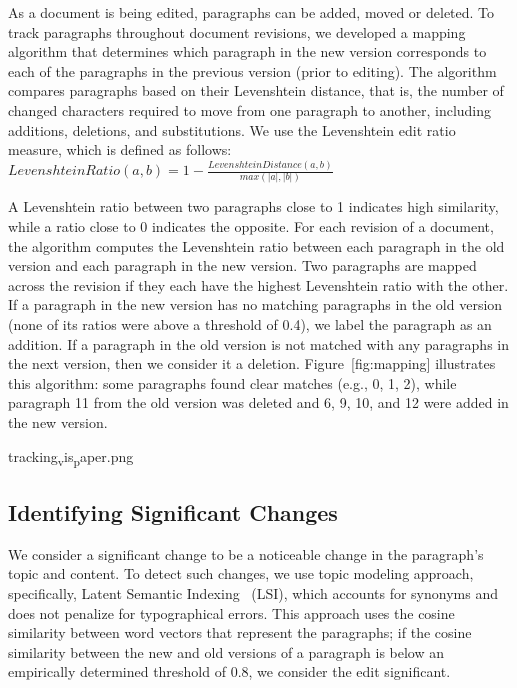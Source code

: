 As a document is being edited, paragraphs can be added, moved or
deleted. To track paragraphs throughout document revisions, we developed
a mapping algorithm that determines which paragraph in the new version
corresponds to each of the paragraphs in the previous version (prior to
editing). The algorithm compares paragraphs based on their Levenshtein
distance, that is, the number of changed characters required to move
from one paragraph to another, including additions, deletions, and
substitutions. We use the Levenshtein edit ratio measure, which is
defined as follows:
\(Levenshtein Ratio(a,b) = 1-\frac{Levenshtein Distance(a,b)}{max(|a|,|b|)} \)

A Levenshtein ratio between two paragraphs close to 1 indicates high
similarity, while a ratio close to 0 indicates the opposite. For each
revision of a document, the algorithm computes the Levenshtein ratio
between each paragraph in the old version and each paragraph in the new
version. Two paragraphs are mapped across the revision if they each have
the highest Levenshtein ratio with the other. If a paragraph in the new
version has no matching paragraphs in the old version (none of its
ratios were above a threshold of 0.4), we label the paragraph as an
addition. If a paragraph in the old version is not matched with any
paragraphs in the next version, then we consider it a deletion.
Figure~{[}fig:mapping{]} illustrates this algorithm: some paragraphs
found clear matches (e.g., 0, 1, 2), while paragraph 11 from the old
version was deleted and 6, 9, 10, and 12 were added in the new version.

tracking\textsubscript{v}is\textsubscript{p}aper.png

\subsection{Identifying Significant
Changes}\label{identifying-significant-changes}

We consider a significant change to be a noticeable change in the
paragraph's topic and content. To detect such changes, we use topic
modeling approach, specifically, Latent Semantic
Indexing~\cite{deerwester1990indexing} (LSI), which accounts for
synonyms and does not penalize for typographical errors. This approach
uses the cosine similarity between word vectors that represent the
paragraphs; if the cosine similarity between the new and old versions of
a paragraph is below an empirically determined threshold of 0.8, we
consider the edit significant.

